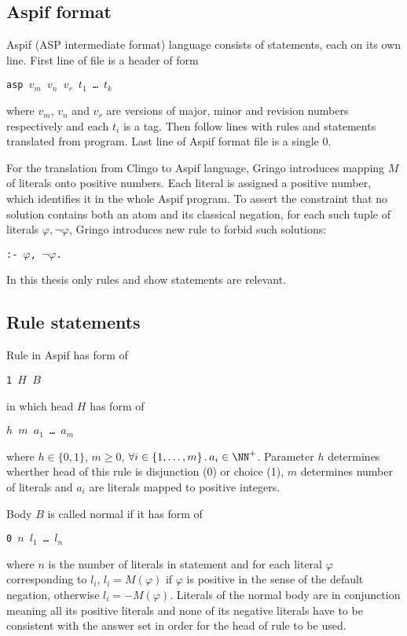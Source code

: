 \subsection{Aspif format}

Aspif (ASP intermediate format) language consists of statements, each on its own
line. First line of file is a header of form 
\begin{center}
    \texttt{asp $v_m$ $v_n$ $v_r$ $t_1$ \dots{} $t_k$}
\end{center}
where $v_m$, $v_n$ and $v_r$ are versions of major, minor and revision numbers
respectively and each $t_i$ is a tag. Then follow lines with rules and statements
translated from program.
Last line of Aspif format file is a single 0.

For the translation from Clingo to Aspif language, Gringo introduces mapping $M$ of literals
onto positive numbers. Each literal is assigned a positive number, which identifies it
in the whole Aspif program. To assert the constraint that no solution contains
both an atom and its classical negation, for each such tuple of literals $\varphi, \neg\varphi$,
Gringo introduces new rule to forbid such solutions:
\begin{center}
    \texttt{:- $\varphi$, $\neg\varphi$.}
\end{center}

In this thesis only rules and show statements are relevant.

\subsection{Rule statements}

Rule in Aspif has form of
\begin{center}
    \texttt{1 $H$ $B$}
\end{center}
in which head $H$ has form of
\begin{center}
    \texttt{$h$ $m$ $a_1$ \dots{} $a_m$}
\end{center}
where $h\in\{0, 1\}$, $m\geq 0$,
$\forall i\in\{1, \dots, m\}\,.\, a_i\in\NN^+$. Parameter $h$ determines
wherther head of this rule is disjunction (0) or choice (1), $m$
determines number of literals and $a_i$ are literals mapped to positive integers.

Body $B$ is called normal if it has form of
\begin{center}
    \texttt{0 $n$ $l_1$ \dots{} $l_n$}
\end{center}
where $n$ is the number of literals in statement and for each literal $\varphi$
corresponding to $l_i$, $l_i = M(\varphi)$ if $\varphi$ is positive in the sense of
the default negation, otherwise $l_i = -M(\varphi)$.
Literals of the normal body are in conjunction meaning all its positive literals
and none of its negative literals have
to be consistent with the answer set in order for the head of rule to be used.

